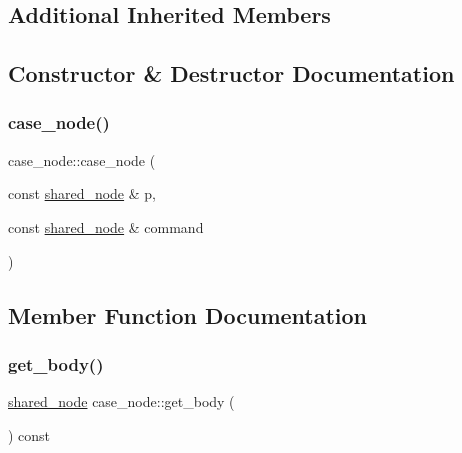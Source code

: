 \subsection*{Additional Inherited Members}


\subsection{Constructor \& Destructor Documentation}
\mbox{\label{classjawe_1_1case__node_a99b22c0a8ef6b596439a876510ee790a}} 
\subsubsection{\texorpdfstring{case\+\_\+node()}{case\_node()}}
{\footnotesize\ttfamily case\+\_\+node\+::case\+\_\+node (\begin{DoxyParamCaption}\item[{const \hyperlink{namespacejawe_a3f307481d921b6cbb50cc8511fc2b544}{shared\+\_\+node} \&}]{p,  }\item[{const \hyperlink{namespacejawe_a3f307481d921b6cbb50cc8511fc2b544}{shared\+\_\+node} \&}]{command }\end{DoxyParamCaption})}



\subsection{Member Function Documentation}
\mbox{\label{classjawe_1_1case__node_a04a49f28923cf8ea3faee431bd6797e7}} 
\subsubsection{\texorpdfstring{get\+\_\+body()}{get\_body()}}
{\footnotesize\ttfamily \hyperlink{namespacejawe_a3f307481d921b6cbb50cc8511fc2b544}{shared\+\_\+node} case\+\_\+node\+::get\+\_\+body (\begin{DoxyParamCaption}{ }\end{DoxyParamCaption}) const}


